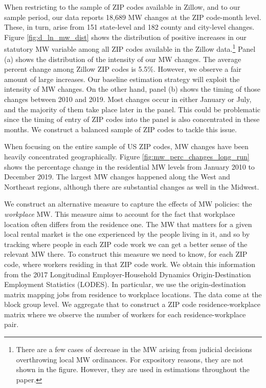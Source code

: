 When restricting to the sample of ZIP codes available in Zillow, and to our sample period, 
our data reports 18,689 MW changes at the ZIP code-month level. These, in turn, arise 
from 151 state-level and 182 county and city-level changes. Figure \ref{fig:d_ln_mw_dist} 
shows the distribution of positive increases in our statutory MW variable among all ZIP 
codes available in the Zillow data.\footnote{There are a few cases of decrease in the 
	MW arising from judicial decisions overthrowing local MW ordinances. For 
	expository reasons, they are not shown in the figure. However, they are 
	used in estimations throughout the paper.} %
Panel (a) shows the distribution of the intensity of our MW changes. The average percent 
change among Zillow ZIP codes is 5.5\%. %
However, we observe a fair amount of large increases. Our baseline estimation strategy will
exploit the intensity of MW changes. On the other hand, panel (b) shows the timing of 
those changes between 2010 and 2019. Most changes occur in either January or July, 
and the majority of them take place later in the panel. This could be problematic since
the timing of entry of ZIP codes into the panel is also concentrated in these months. We 
construct a balanced sample of ZIP codes to tackle this issue.

When focusing on the entire sample of US ZIP codes, MW changes have been heavily concentrated geographically. Figure \ref{fig:mw_perc_changes_long_run} shows the percentage change in the residential MW levels from January 2010 to December 2019. The largest MW changes happened
along the West and Northeast regions, although there are substantial changes as well in the 
Midwest.

We construct an alternative measure to capture the effects of MW policies: the 
\textit{workplace} MW. This measure aims to account for the fact that workplace location 
often differs from the residence one. The MW that matters for a given local rental market 
is the one experienced by the people living in it, and so by tracking where people in 
each ZIP code work we can get a better sense of the relevant MW there.
To construct this measure we need to know, for each ZIP code, where workers residing in 
that ZIP code work. We obtain this information from the 2017 Longitudinal Employer-Household 
Dynamics Origin-Destination Employment Statistics (LODES). In particular, we use the 
origin-destination matrix mapping jobs from residence to workplace locations. The data 
come at the block group level. We aggregate that to construct a ZIP code residence-workplace 
matrix where we observe the number of workers for each residence-workplace pair.


